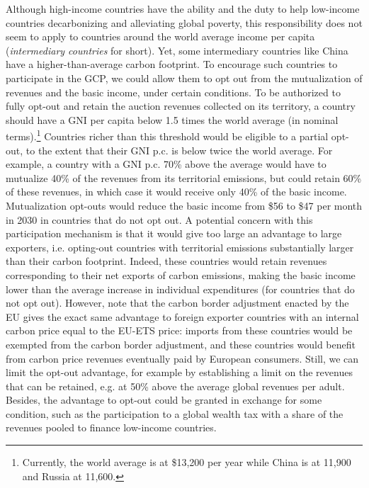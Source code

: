\documentclass[12pt,english]{article}
\begin{document}
Although high-income countries have the ability and the duty to help low-income countries decarbonizing and alleviating global poverty, this responsibility does not seem to apply to countries around the world average income per capita (\textit{intermediary countries} for short). Yet, some intermediary countries like China have a higher-than-average carbon footprint. To encourage such countries to participate in the GCP, we could allow them to opt out from the mutualization of revenues and the basic income, under certain conditions. To be authorized to fully opt-out and retain the auction revenues collected on its territory, a country should have a GNI per capita below 1.5 times 
the world average (in nominal terms).\footnote{Currently, the world average is at \$13,200 per year while China is at 11,900 and Russia at 11,600.} Countries richer than this threshold %
would be eligible to a partial opt-out, to the extent that their GNI p.c. is below twice the world average. For example, a country with a GNI p.c. 70\% above the average would have to mutualize 40\% of the revenues from its territorial emissions, but could retain 60\% of these revenues, in which case it would receive only 40\% of the basic income. Mutualization opt-outs would reduce the basic income from \$56 to \$47 per month in 2030 in countries that do not opt out. 
A potential concern with this participation mechanism is that it would give too large an advantage to large exporters, i.e. opting-out countries with territorial emissions substantially larger than their carbon footprint. Indeed, these countries would retain revenues corresponding to their net exports of carbon emissions, making the basic income lower than the average increase in individual expenditures (for countries that do not opt out). However, note that the carbon border adjustment enacted by the EU gives the exact same advantage to foreign exporter countries with an internal carbon price equal to the EU-ETS price: imports from these countries would be exempted from the carbon border adjustment, and these countries would benefit from carbon price revenues eventually paid by European consumers. Still, we can limit the opt-out advantage, for example by establishing a limit on the revenues that can be retained, e.g. at 50\% above the average global revenues per adult. %
Besides, the advantage to opt-out could be granted in exchange for some condition, such as the participation to a global wealth tax with a share of the revenues pooled to finance low-income countries. %
\end{document}
